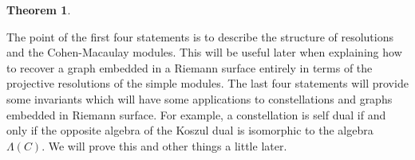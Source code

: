 \documentclass[11pt,oneside]{amsbook}
\numberwithin{equation}{section}
\theoremstyle{plain}
\newtheorem{theorem}{Theorem}[section]
\theoremstyle{definition}
\theoremstyle{remark}
\newcommand{\Z}{\mathbb{Z}}
\DeclareMathOperator{\Hom}{\mathrm{Hom}}
\begin{document}
\begin{theorem}
\begin{enumerate}
			
			
			
			
			
		\end{enumerate}
	\end{theorem}
	
	
	
	
	
	The point of the first four statements is to describe the structure of resolutions and the Cohen-Macaulay modules. This will be useful later when explaining how to recover a graph embedded in a Riemann surface entirely in terms of the projective resolutions of the simple modules. The last four statements will provide some invariants which will have some applications to constellations and graphs embedded in Riemann surface. For example, a constellation is self dual if and only if the opposite algebra of the Koszul dual is isomorphic to the algebra $\Lambda(C)$. We will prove this and other things a little later.
	
	
	
	
	
\end{document}

